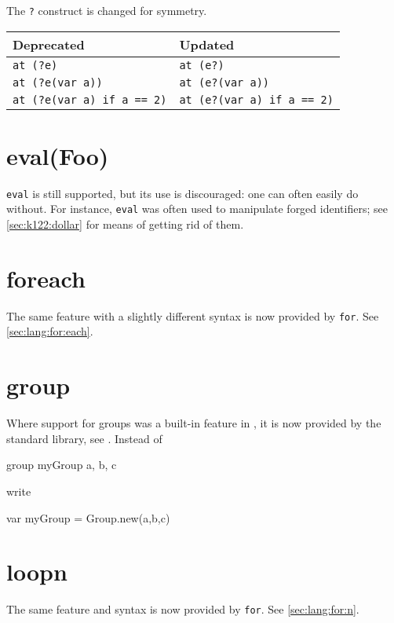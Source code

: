The \lstinline{?} construct is changed for symmetry.

\begin{center}
  \begin{tabular}{|l|l|}
    \hline
    \textbf{Deprecated} & \textbf{Updated}  \\
    \hline
    \lstinline|at (?e)|                  & \lstinline|at (e?)|\\
    \lstinline|at (?e(var a))|           & \lstinline|at (e?(var a))|\\
    \lstinline|at (?e(var a) if a == 2)| & \lstinline|at (e?(var a) if a == 2)|\\
    \hline
  \end{tabular}
\end{center}


\section{eval(Foo)}
\lstinline{eval} is still supported, but its use is discouraged: one
can often easily do without.  For instance, \lstinline{eval} was often
used to manipulate forged identifiers; see \autoref{sec:k122:dollar}
for means of getting rid of them.

\section{foreach}
The same feature with a slightly different syntax is now provided by
\lstinline|for|.  See \autoref{sec:lang:for:each}.

\section{group}
Where support for groups was a built-in feature in , it is now
provided by the standard library, see .  Instead of
\begin{urbiunchecked}
group myGroup {a, b, c}
\end{urbiunchecked}
\noindent
write
\begin{urbiunchecked}
var myGroup = Group.new(a,b,c)
\end{urbiunchecked}

\section{loopn}
The same feature and syntax is now provided by \lstinline|for|.  See
\autoref{sec:lang:for:n}.

